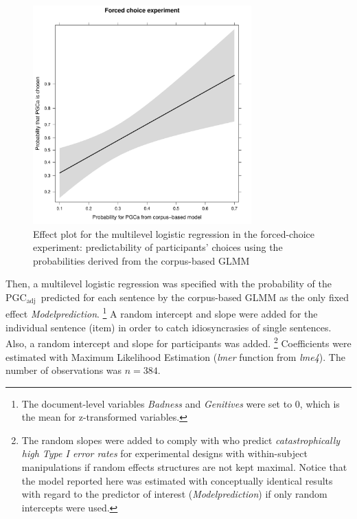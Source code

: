 \documentclass[USenglish]{article}
\newcommand{\Sub}[1]{\ensuremath{\mathrm{_{#1}}}}
\newcommand{\PGCa}{PGC\Sub{adj}}
\begin{document}
\begin{figure}[hb!]
\centering
\includegraphics[width=0.75\textwidth]{../R/output/fc_effects}
\caption{Effect plot for the multilevel logistic regression in the forced-choice experiment: predictability of participants' choices using the probabilities derived from the corpus-based GLMM}
\label{fig:afc:effects}
\end{figure}

Then, a multilevel logistic regression was specified with the probability of the \PGCa\ predicted for each sentence by the corpus-based GLMM as the only fixed effect \textit{Modelprediction}.%
\footnote{The document-level variables \textit{Badness} and \textit{Genitives} were set to $0$, which is the mean for z-transformed variables.}
A random intercept and slope were added for the individual sentence (item) in order to catch idiosyncrasies of single sentences.
Also, a random intercept and slope for participants was added.%
\footnote{The random slopes were added to comply with \citet[257]{BarrEa2013} who predict \textit{catastrophically high Type I error rates} for experimental designs with within-subject manipulations if random effects structures are not kept maximal.
Notice that the model reported here was estimated with conceptually identical results with regard to the predictor of interest (\textit{Modelprediction}) if only random intercepts were used.}
Coefficients were estimated with Maximum Likelihood Estimation (\textit{lmer} function from \textit{lme4}).
The number of observations was $n=384$.
\end{document}
